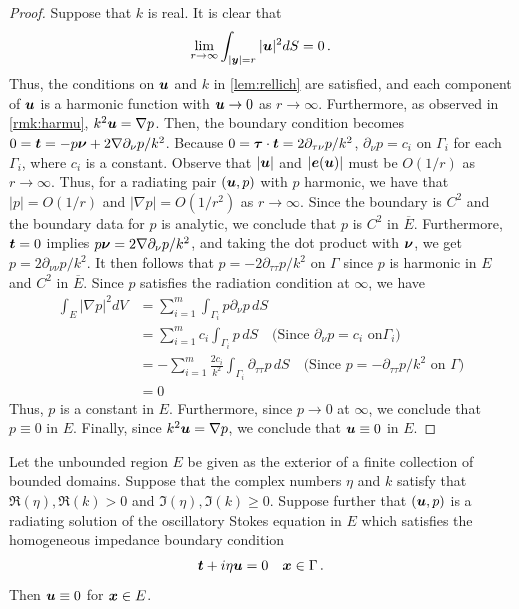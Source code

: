 \begin{proof}
Suppose that $k$ is real. It is clear that
\begin{equation}
\lim_{r\to\infty} \int_{|{\boldsymbol y}|=r} |{\boldsymbol u}|^2 dS = 0 \, . \nonumber
\end{equation}
Thus, the conditions on ${\boldsymbol u}$ and $k$ in \cref{lem:rellich}
are satisfied, and each component of ${\boldsymbol u}$ is a harmonic function
with ${\boldsymbol u} \to 0$ as $r \to \infty$. Furthermore, as observed
in \cref{rmk:harmu}, $k^2 {\boldsymbol u} = \nabla p$. Then, the boundary
condition becomes $0 = {\boldsymbol t} = -p {\boldsymbol \nu} + 2 \nabla \partial_\nu p/k^2$.
Because $0 = {\boldsymbol \tau} \cdot {\boldsymbol t} = 2\partial_{\tau\nu} p/k^2$,
$\partial_\nu p  = c_{i}$ on $\Gamma_{i}$ for each $\Gamma_{i}$,
where $c_{i}$ is a constant. 
Observe that $|{\boldsymbol u}|$ and $|{\boldsymbol e}({\boldsymbol u})|$ must be $O(1/r)$ as
$r\to\infty$. Thus,
for a radiating pair $({\boldsymbol u},p)$ with $p$ harmonic,
we have that $|p| = O(1/r)$ and $|\nabla p| = O(1/r^2)$
as $r\to\infty$.
Since the boundary is $C^{2}$ and the boundary data for $p$
is analytic, we conclude that $p$ is $C^{2}$ in
$\overline{E}$.
Furthermore, ${\boldsymbol t}=0$ implies $p {\boldsymbol \nu} = 2\nabla \partial_{\nu} p/k^2$, 
and taking the dot
product with ${\boldsymbol \nu}$, we get
$p = 2\partial_{\nu \nu}p/k^2$. 
It then follows that
$p = -2\partial_{\tau \tau}p/k^2$ on $\Gamma$ since 
$p$ is harmonic in $E$ and $C^{2}$ in $\overline{E}$. 
Since $p$ satisfies the radiation condition at $\infty$,
we have
\begin{equation}
\begin{aligned}
\int_{E} |\nabla p|^2 dV &= 
\sum_{i=1}^{m} \int_{\Gamma_{i}} p \partial_{\nu}p \,dS \\
&= \sum_{i=1}^{m} c_{i} \int_{\Gamma_{i}} p \,dS \quad \text{(Since $\partial_{\nu} p = c_{i}$ on
$\Gamma_{i}$)} \\ 
&= -\sum_{i=1}^{m} \frac{2c_{i}}{k^2} \int_{\Gamma_{i}} \partial_{\tau \tau} p \,dS 
\quad \text{(Since $p = -\partial_{\tau \tau}p/k^2$ on $\Gamma$)} \\
&= 0
\end{aligned}
\end{equation}
Thus, $p$ is a constant in $E$. Furthermore, since $p\to 0$ at $\infty$, 
we conclude that $p\equiv 0$ in $E$. 
Finally, since $k^2 {\boldsymbol u} = \nabla p$, we conclude that ${\boldsymbol u}\equiv 0$ in 
$E$.
\end{proof}

\begin{thrm}
  Let the unbounded region $E$ be given as the exterior
  of a finite collection of bounded domains.
  Suppose that the complex numbers $\eta$ and $k$ satisfy that
  $\Re(\eta), \Re(k) > 0$ and $\Im(\eta),\Im(k) \geq 0$.
  Suppose further that
  $({\boldsymbol u},p)$ is a radiating solution of the
  oscillatory Stokes equation in $E$ which satisfies
  the homogeneous impedance boundary condition
  \begin{equation}
{\boldsymbol t} + i \eta {\boldsymbol u} = 0 \quad {\boldsymbol x} \in \Gamma \, . \nonumber
\end{equation}
Then ${\boldsymbol u} \equiv 0$ for ${\boldsymbol x} \in E$.
\end{thrm}

